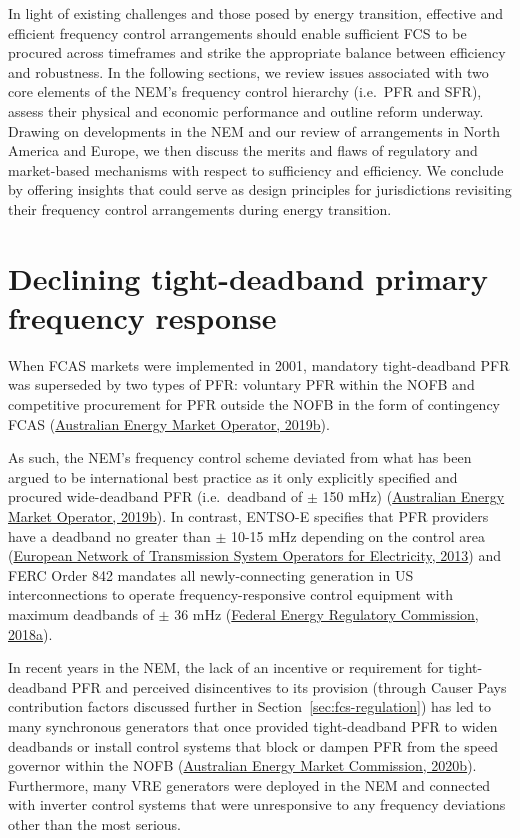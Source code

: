 \documentclass[12pt,a4paper,]{report}
\begin{document}
In light of existing challenges and those posed by energy transition,
effective and efficient frequency control arrangements should enable
sufficient FCS to be procured across timeframes and strike the
appropriate balance between efficiency and robustness. In the following
sections, we review issues associated with two core elements of the
NEM's frequency control hierarchy (i.e.~PFR and SFR), assess their
physical and economic performance and outline reform underway. Drawing
on developments in the NEM and our review of arrangements in North
America and Europe, we then discuss the merits and flaws of regulatory
and market-based mechanisms with respect to sufficiency and efficiency.
We conclude by offering insights that could serve as design principles
for jurisdictions revisiting their frequency control arrangements during
energy transition.

\hypertarget{sec:fcs-pfr}{%
\section{Declining tight-deadband primary frequency
response}\label{sec:fcs-pfr}}

When FCAS markets were implemented in 2001, mandatory tight-deadband PFR
was superseded by two types of PFR: voluntary PFR within the NOFB and
competitive procurement for PFR outside the NOFB in the form of
contingency FCAS
(\protect\hyperlink{ref-australianenergymarketoperatorElectricityRuleChange2019}{Australian
Energy Market Operator, 2019b}).

As such, the NEM's frequency control scheme deviated from what has been
argued to be international best practice as it only explicitly specified
and procured wide-deadband PFR (i.e.~deadband of \(\pm\) 150 mHz)
(\protect\hyperlink{ref-australianenergymarketoperatorElectricityRuleChange2019}{Australian
Energy Market Operator, 2019b}). In contrast, ENTSO-E specifies that PFR
providers have a deadband no greater than \(\pm\) 10-15 mHz depending on
the control area
(\protect\hyperlink{ref-europeannetworkoftransmissionsystemoperatorsforelectricityentso-eNetworkCodeLoadFrequency2013}{European
Network of Transmission System Operators for Electricity, 2013}) and
FERC Order 842 mandates all newly-connecting generation in US
interconnections to operate frequency-responsive control equipment with
maximum deadbands of \(\pm\) 36 mHz
(\protect\hyperlink{ref-federalenergyregulatorycommissionfercOrderNo8422018}{Federal
Energy Regulatory Commission, 2018a}).

In recent years in the NEM, the lack of an incentive or requirement for
tight-deadband PFR and perceived disincentives to its provision (through
Causer Pays contribution factors discussed further in
Section~\ref{sec:fcs-regulation}) has led to many synchronous generators
that once provided tight-deadband PFR to widen deadbands or install
control systems that block or dampen PFR from the speed governor within
the NOFB
(\protect\hyperlink{ref-australianenergymarketcommissionMandatoryPrimaryFrequency2020}{Australian
Energy Market Commission, 2020b}). Furthermore, many VRE generators were
deployed in the NEM and connected with inverter control systems that
were unresponsive to any frequency deviations other than the most
serious.
\end{document}
